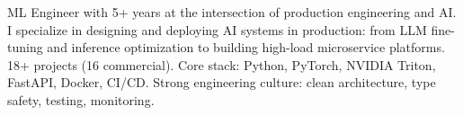 \documentclass[]{deedy-resume-reversed}
\begin{document}




{\fontsize{9.5pt}{12pt}\selectfont ML Engineer with 5+ years at the intersection of production engineering and AI. I specialize in designing and deploying AI systems in production: from LLM fine-tuning and inference optimization to building high-load microservice platforms. 18+ projects (16 commercial). Core stack: Python, PyTorch, NVIDIA Triton, FastAPI, Docker, CI/CD. Strong engineering culture: clean architecture, type safety, testing, monitoring.}

\vspace{4pt}
\noindent\makebox[\linewidth]{\color{accent}\rule{\linewidth}{0.6pt}}
\vspace{2pt}

\end{document}

